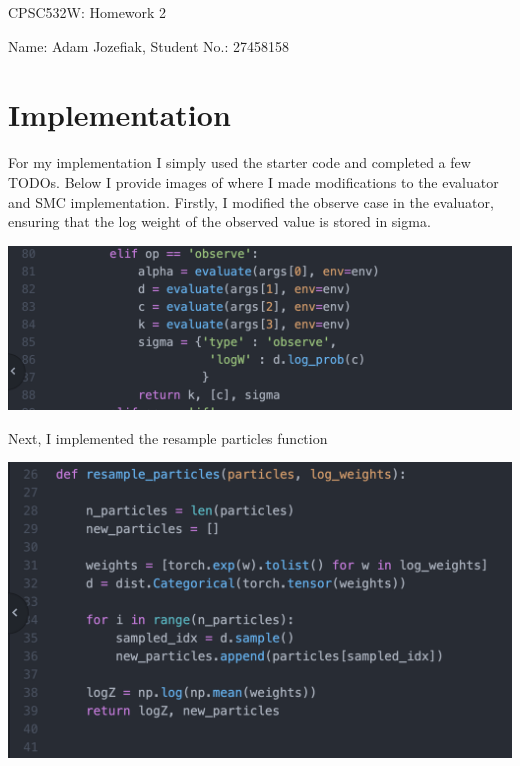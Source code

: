 \documentclass[11pt]{article}
\theoremstyle{definition}
\begin{document}
\begin{framed}
\begin{center}
\Large{\sc CPSC532W: Homework 2}
\end{center}
\hfill Name: Adam Jozefiak, Student No.: 27458158 

\end{framed}

\section{Implementation}

For my implementation I simply used the starter code and completed a few TODOs. Below I provide images of where I made modifications to the evaluator and SMC implementation. Firstly, I modified the observe case in the evaluator, ensuring that the log weight of the observed value is stored in sigma.

\begin{center}
\includegraphics[scale=0.5]{../implementation/observe}
\end{center}

Next, I implemented the resample particles function

\begin{center}
\includegraphics[scale=0.5]{../implementation/resample}
\end{center}
\end{document}
